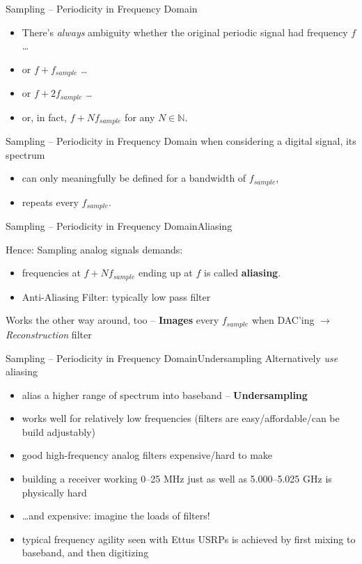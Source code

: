 \documentclass{beamer}
\begin{document}
\begin{frame}{Sampling -- Periodicity in Frequency Domain}{}
  \begin{itemize}
    \item<1-> There's \emph{always} ambiguity whether the original periodic signal had frequency $f$ \ldots
    \item<2-> or $f+f_{sample}$ \ldots
    \item<3-> or $f+2f_{sample}$ \ldots
    \item<4-> or, in fact, $f+Nf_{sample}$ for any $N \in \mathbb N$.
  \end{itemize}
\end{frame}
\begin{frame}{Sampling -- Periodicity in Frequency Domain}{}
  when considering a digital signal, its spectrum
  \begin{itemize}
    \item can only meaningfully be defined for a bandwidth of $f_{sample}$,
    \item repeats every $f_{sample}$.
  \end{itemize}

\end{frame}
\begin{frame}{Sampling -- Periodicity in Frequency Domain}{Aliasing}

  Hence: Sampling analog signals demands:\\

  \begin{itemize}
    \item frequencies at $f + Nf_{sample}$ ending up at $f$ is called \textbf{aliasing}.
    \item Anti-Aliasing Filter: typically low pass filter
  \end{itemize}

  Works the other way around, too -- \textbf{Images} every $f_{sample}$ when DAC'ing $\rightarrow$ \emph{Reconstruction} filter
\end{frame}
\begin{frame}{Sampling -- Periodicity in Frequency Domain}{Undersampling}
    Alternatively \emph{use} aliasing
      \begin{itemize}
        \item alias a higher range of spectrum into baseband -- \textbf{Undersampling}
        \item works well for relatively low frequencies (filters are easy/affordable/can be build adjustably)
        \item good high-frequency analog filters expensive/hard to make
        \item building a receiver working 0--25 MHz just as well as 5.000--5.025 GHz is physically hard
        \item \ldots and expensive: imagine the loads of filters!
        \item typical frequency agility seen with Ettus USRPs is achieved by first mixing to baseband, and then digitizing
      \end{itemize}
\end{frame}
\end{document}
